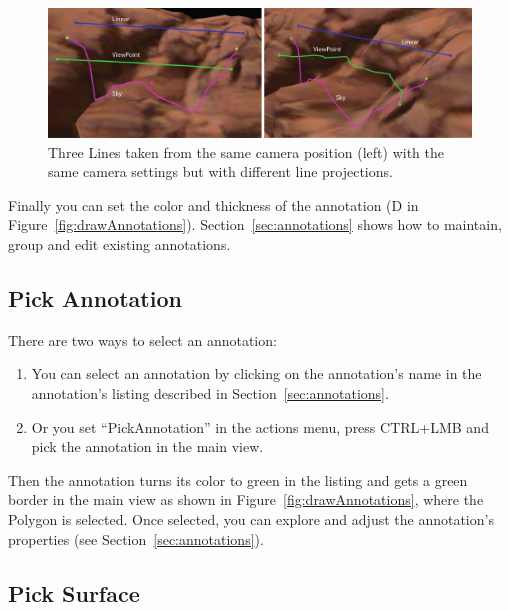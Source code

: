 \begin{figure}[h]
    	\centering
    		\includegraphics[width=1\textwidth]{pics/projectionAI.png}
    	\caption[Projections]{Three Lines taken from the same camera position (left) with the same camera settings but with different line projections.}
    	\label{fig:projection}
   \end{figure}
	
Finally you can set the color and thickness of the annotation (D in Figure~\ref{fig:drawAnnotations}).
Section~\ref{sec:annotations} shows how to maintain, group and edit existing annotations.

\subsection{Pick Annotation}
\label{sec:pickAnnotation}

There are two ways to select an annotation:

\begin{enumerate}
	\item You can select an annotation by clicking on the annotation's name in the annotation's listing described in Section~\ref{sec:annotations}.
	\item Or you set ``PickAnnotation'' in the actions menu, press CTRL+LMB and pick the annotation in the main view.
\end{enumerate}
Then the annotation turns its color to green in the listing and gets a green border in the main view as shown in Figure~\ref{fig:drawAnnotations}, where the Polygon is selected. Once selected, you can explore and adjust the annotation's properties (see Section~\ref{sec:annotations}).
\subsection{Pick Surface}
\label{sec:pickSurface}

